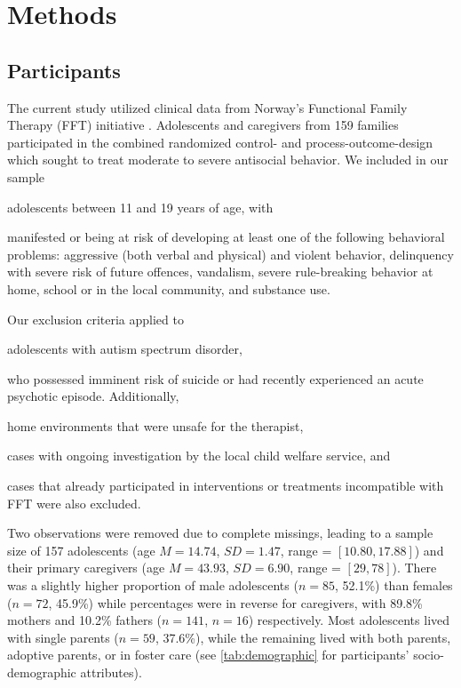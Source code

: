 \section{Methods}

\subsection{Participants}

The current study utilized clinical data from Norway's Functional Family Therapy (FFT) initiative \parencite{bjornebekk:2013}. Adolescents and caregivers from 159 families participated in the combined randomized control- and process-outcome-design which sought to treat moderate to severe antisocial behavior. We included in our sample
\begin{seriate}
    \item adolescents between 11 and 19 years of age, with
    \item manifested or being at risk of developing at least one of the following behavioral problems: aggressive (both verbal and physical) and violent behavior, delinquency with severe risk of future offences, vandalism, severe rule-breaking behavior at home, school or in the local community, and substance use.%
\end{seriate}
Our exclusion criteria applied to
\begin{seriate}
    \item adolescents with autism spectrum disorder,
    \item who possessed imminent risk of suicide or had recently experienced an acute psychotic episode. Additionally,
    \item home environments that were unsafe for the therapist,
    \item cases with ongoing investigation by the local child welfare service, and
    \item cases that already participated in interventions or treatments incompatible with FFT were also excluded.%
\end{seriate}

Two observations were removed due to complete missings, leading to a sample size of 157 adolescents (age $M = 14.74$, $SD = 1.47$, range = $[10.80, 17.88]$) and their primary caregivers (age $M = 43.93$, $SD = 6.90$, range = $[29, 78]$). There was a slightly higher proportion of male adolescents ($n = 85$, 52.1\%) than females ($n = 72$, 45.9\%) while percentages were in reverse for caregivers, with 89.8\% mothers and 10.2\% fathers ($n = 141$, $n = 16$) respectively. Most adolescents lived with single parents ($n=59$, 37.6\%), while the remaining lived with both parents, adoptive parents, or in foster care (see \cref{tab:demographic} for participants' socio-demographic attributes).

